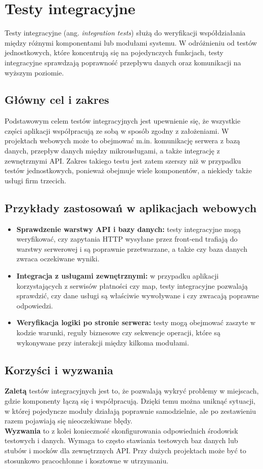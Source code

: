 \documentclass[12pt]{report}
\begin{document}
\section{Testy integracyjne}
\label{sec:testy-integracyjne}
Testy integracyjne (ang. \emph{integration tests}) służą do weryfikacji współdziałania między różnymi komponentami lub modułami systemu. W odróżnieniu od testów jednostkowych, które koncentrują się na pojedynczych funkcjach, testy integracyjne sprawdzają poprawność przepływu danych oraz komunikacji na wyższym poziomie.

\subsection*{Główny cel i zakres}
Podstawowym celem testów integracyjnych jest upewnienie się, że wszystkie części aplikacji współpracują ze sobą w sposób zgodny z założeniami. W projektach webowych może to obejmować m.in. komunikację serwera z bazą danych, przepływ danych między mikrousługami, a także integrację z zewnętrznymi API. Zakres takiego testu jest zatem szerszy niż w przypadku testów jednostkowych, ponieważ obejmuje wiele komponentów, a niekiedy także usługi firm trzecich.

\subsection*{Przykłady zastosowań w aplikacjach webowych}
\begin{itemize}
    \item \textbf{Sprawdzenie warstwy API i bazy danych:} testy integracyjne mogą weryfikować, czy zapytania HTTP wysyłane przez front-end trafiają do warstwy serwerowej i są poprawnie przetwarzane, a także czy baza danych zwraca oczekiwane wyniki.
    \item \textbf{Integracja z usługami zewnętrznymi:} w przypadku aplikacji korzystających z serwisów płatności czy map, testy integracyjne pozwalają sprawdzić, czy dane usługi są właściwie wywoływane i czy zwracają poprawne odpowiedzi.
    \item \textbf{Weryfikacja logiki po stronie serwera:} testy mogą obejmować zaszyte w kodzie warunki, reguły biznesowe czy sekwencje operacji, które są wykonywane przy interakcji między kilkoma modułami.
\end{itemize}

\subsection*{Korzyści i wyzwania}
\textbf{Zaletą} testów integracyjnych jest to, że pozwalają wykryć problemy w miejscach, gdzie komponenty łączą się i współpracują. Dzięki temu można uniknąć sytuacji, w której pojedyncze moduły działają poprawnie samodzielnie, ale po zestawieniu razem pojawiają się nieoczekiwane błędy. \\
\textbf{Wyzwania} to z kolei konieczność skonfigurowania odpowiednich środowisk testowych i danych. Wymaga to często stawiania testowych baz danych lub stubów i mocków dla zewnętrznych API. Przy dużych projektach może być to stosunkowo pracochłonne i kosztowne w utrzymaniu. 
\end{document}
